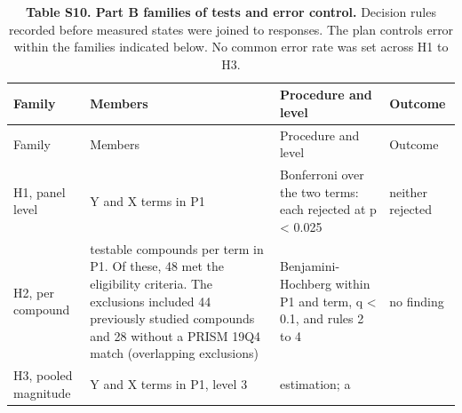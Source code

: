 \documentclass[
  11pt,
  letterpaper,
]{article}
\begin{document}
\begin{longtable}[]{@{}
  >{\raggedright\arraybackslash}p{}
  >{\raggedright\arraybackslash}p{}
  >{\raggedright\arraybackslash}p{}
  >{\raggedright\arraybackslash}p{}@{}}
\caption{\textbf{Table S10. Part B families of tests and error control.}
Decision rules recorded before measured states were joined to responses.
The plan controls error within the families indicated below. No common
error rate was set across H1 to H3.}\tabularnewline
\toprule\noalign{}
\begin{minipage}[b]{\linewidth}\raggedright
Family
\end{minipage} & \begin{minipage}[b]{\linewidth}\raggedright
Members
\end{minipage} & \begin{minipage}[b]{\linewidth}\raggedright
Procedure and level
\end{minipage} & \begin{minipage}[b]{\linewidth}\raggedright
Outcome
\end{minipage} \\
\midrule\noalign{}
\endfirsthead
\toprule\noalign{}
\begin{minipage}[b]{\linewidth}\raggedright
Family
\end{minipage} & \begin{minipage}[b]{\linewidth}\raggedright
Members
\end{minipage} & \begin{minipage}[b]{\linewidth}\raggedright
Procedure and level
\end{minipage} & \begin{minipage}[b]{\linewidth}\raggedright
Outcome
\end{minipage} \\
\midrule\noalign{}
\endhead
\bottomrule\noalign{}
\endlastfoot
H1, panel level & Y and X terms in P1 & Bonferroni over the two terms:
each rejected at p \textless{} 0.025 & neither rejected \\
H2, per compound & 114 testable compounds per term in P1. Of these, 48
met the eligibility criteria. The exclusions included 44 previously
studied compounds and 28 without a PRISM 19Q4 match (overlapping
exclusions) & Benjamini-Hochberg within P1 and term, q \textless{} 0.1,
and rules 2 to 4 & no finding \\
H3, pooled magnitude & Y and X terms in P1, level 3 & estimation; a

\end{longtable}
\end{document}
